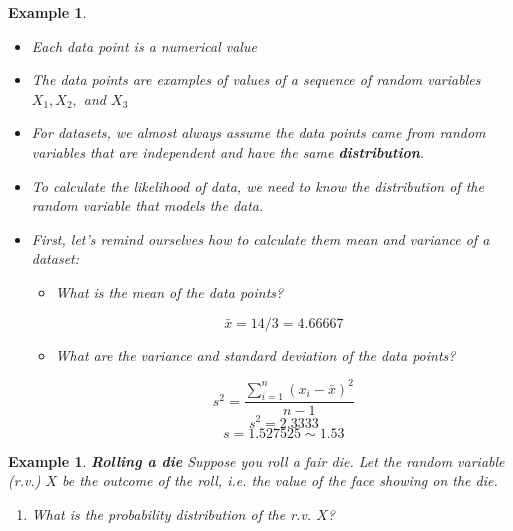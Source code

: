 \documentclass[12pt]{amsart}
\newtheorem{example}[theorem]{Example}
\begin{document}
{\begin{example}
\begin{itemize}
\item Each data point is a numerical value
\item The data points are examples of values of a sequence of random variables $X_1, X_2,$ and $X_3$
\item For datasets, we almost always assume the data points came from random variables that are independent and have the same \textbf{distribution}. 
\item To calculate the likelihood of data, we need to know the distribution of the random variable that models the data.

\item First, let's remind ourselves how to calculate them mean and variance of a dataset:
	\begin{itemize}
	\item What is the mean of the data points?

\color{blue}
$$\bar{x} = 14/3 = 4.66667$$
\color{black}
\vspace{1.5cm}
	\item What are the variance and standard deviation of the data points?

\color{blue}
$$
s^2 = \frac{\sum_{i=1}^n(x_i - \bar{x})^2}{n-1}
$$
$$s^2 = 2.3333$$
$$s = 1.527525 \sim 1.53$$
\color{black}

	\end{itemize}


\end{itemize}
\end{example} 

\newpage



\begin{example}  \textbf{Rolling a die} \newline
Suppose you roll a fair die. Let the random variable (r.v.) $X$ be the outcome of the roll, i.e. the value of the face showing on the die. 

\begin{enumerate}
\item What is the probability distribution of the r.v. $X$?
\vspace{3cm}


\end{enumerate}
\end{example}}
\end{document}
